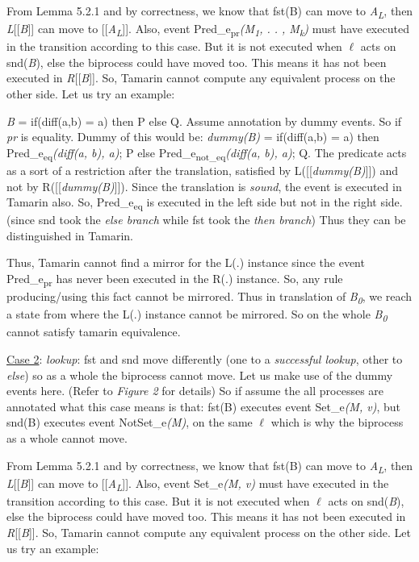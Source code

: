 \documentclass[11pt]{article}
\begin{document}
From Lemma 5.2.1 and by correctness, we know that fst(B) can move to {\it A\textsubscript{L}}, then {\it L}[[{\it B}]] can move to [[{\it A\textsubscript{L}}]]. Also, event Pred\_e\textsubscript{pr}{\it (M\textsubscript{1}, . . , M\textsubscript{k})} must have executed in the transition according to this case. But it is not executed when $\ell$ acts on snd({\it B}), else the biprocess could have moved too. This means it has not been executed in {\it R}[[{\it B}]]. So, Tamarin cannot compute any equivalent process on the other side. Let us try an example:

{\it B} = if(diff(a,b) = a) then P else Q. Assume annotation by dummy events. So if {\it pr} is equality. Dummy of this would be: {\it dummy(B)} = if(diff(a,b) = a) then Pred\_e\textsubscript{eq}{\it (diff(a, b), a)}; P else Pred\_e\textsubscript{not\_eq}{\it (diff(a, b), a)}; Q. The predicate acts as a sort of a restriction after the translation, satisfied by L([[{\it dummy(B)}]]) and not by R([[{\it dummy(B)}]]). Since the translation is {\it sound}, the event is executed in Tamarin also. So, Pred\_e\textsubscript{eq} is executed in the left side but not in the right side. (since snd took the {\it else branch} while fst took the {\it then branch}) Thus they can be distinguished in Tamarin. 

Thus, Tamarin cannot find a mirror for the L(.) instance since the event Pred\_e\textsubscript{pr} has never been executed in the R(.) instance. So, any rule producing/using this fact cannot be mirrored. Thus in translation of {\it B\textsubscript{0}}, we reach a state from where the L(.) instance cannot be mirrored. So on the whole {\it B\textsubscript{0}} cannot satisfy tamarin equivalence.\newline

\underline{Case 2}:  {\it lookup}: fst and snd move differently (one to a {\it successful lookup}, other to {\it else}) so as a whole the biprocess cannot move. Let us make use of the dummy events here. (Refer to {\it Figure 2} for details) So if assume the all processes are annotated what this case means is that: fst(B) executes event Set\_e{\it (M, v)}, but snd(B) executes event NotSet\_e{\it (M)}, on the same $\ell$ which is why the biprocess as a whole cannot move.

From Lemma 5.2.1 and by correctness, we know that fst(B) can move to {\it A\textsubscript{L}}, then {\it L}[[{\it B}]] can move to [[{\it A\textsubscript{L}}]]. Also, event Set\_e{\it (M, v)} must have executed in the transition according to this case. But it is not executed when $\ell$ acts on snd({\it B}), else the biprocess could have moved too. This means it has not been executed in {\it R}[[{\it B}]]. So, Tamarin cannot compute any equivalent process on the other side. Let us try an example:
\end{document}
